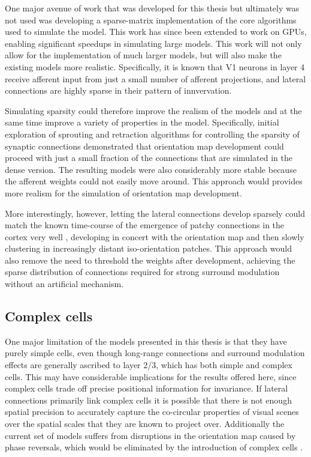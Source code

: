 One major avenue of work that was developed for this thesis but
ultimately was not used was developing a sparse-matrix implementation
of the core algorithms used to simulate the model. This work has since
been extended to work on GPUs, enabling significant speedups in
simulating large models. This work will not only allow for the
implementation of much larger models, but will also make the existing
models more realistic. Specifically, it is known that V1 neurons in
layer 4 receive afferent input from just a small number of afferent
projections, and lateral connections are highly sparse in their
pattern of innvervation.

Simulating sparsity could therefore improve the realism of the models
and at the same time improve a variety of properties in the
model. Specifically, initial exploration of sprouting and retraction
algorithms for controlling the sparsity of synaptic connections
demonstrated that orientation map development could proceed with just
a small fraction of the connections that are simulated in the dense
version.  The resulting models were also considerably more stable because
the afferent weights could not easily move around. This approach would
provides more realism for the simulation of orientation map development.

More interestingly, however, letting the lateral connections develop
sparsely could match the known time-course of the emergence of patchy
connections in the cortex very well \citep{Ruthazer1996}, developing
in concert with the orientation map and then slowly clustering in
increasingly distant iso-orientation patches. This approach would also
remove the need to threshold the weights after development, achieving
the sparse distribution of connections required for strong surround
modulation without an artificial mechanism.

\subsection{Complex cells}

One major limitation of the models presented in this thesis is that they
have purely simple cells, even though long-range connections
and surround modulation effects are generally ascribed to layer 2/3,
which has both simple and complex cells. This may have considerable
implications for the results offered here, since complex cells trade
off precise positional information for invariance. If lateral
connections primarily link complex cells it is possible that there is
not enough spatial precision to accurately capture the co-circular
properties of visual scenes over the spatial scales that they are
known to project over. Additionally the current set of models suffers
from disruptions in the orientation map caused by phase reversals,
which would be eliminated by the introduction of complex cells
\citep{Antolik2010}.

